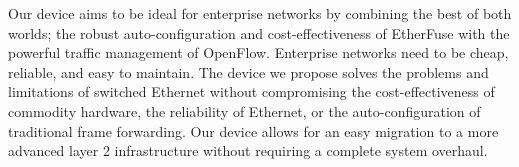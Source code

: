 \documentclass{article}
\begin{document}
	Our device aims to be ideal for enterprise networks by combining the best of both worlds; the robust auto-configuration and cost-effectiveness of EtherFuse with the powerful traffic management of OpenFlow.
	Enterprise networks need to be cheap, reliable, and easy to maintain.
	The device we propose solves the problems and limitations of switched Ethernet without compromising the cost-effectiveness of commodity hardware, the reliability of Ethernet, or the auto-configuration of traditional frame forwarding.
	Our device allows for an easy migration to a more advanced layer 2 infrastructure without requiring a complete system overhaul.

\newpage


\end{document}

